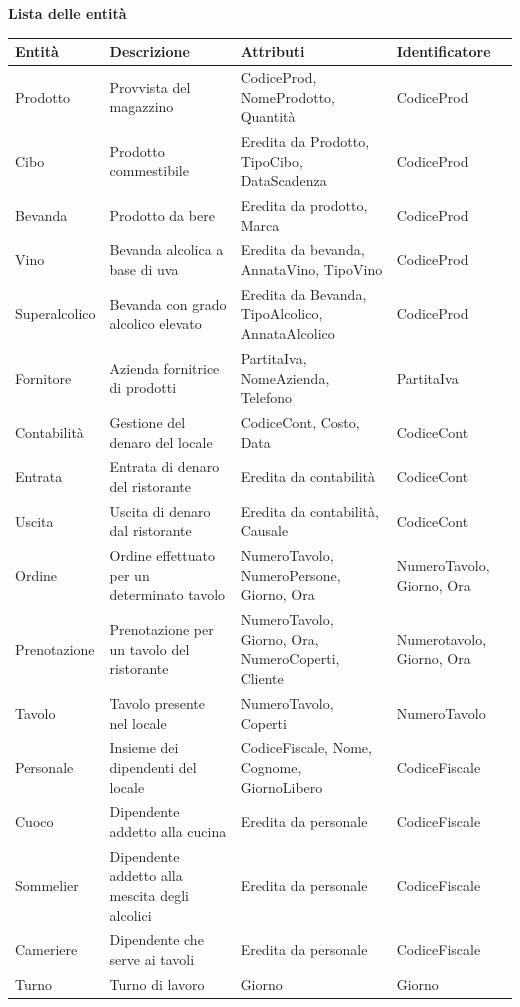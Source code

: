 \textbf{Lista delle entità}
\begin{longtable}{p{2.5cm} p{5.5cm} p{5.5cm} p{2.5cm}}
    \toprule
    \textbf{Entità} & \textbf{Descrizione} &   \textbf{Attributi} & \textbf{Identificatore}\\ \midrule
    Prodotto & Provvista del magazzino & CodiceProd, NomeProdotto, Quantità & CodiceProd\\ \midrule
    Cibo & Prodotto commestibile & Eredita da Prodotto, TipoCibo, DataScadenza & CodiceProd \\ \midrule
    Bevanda	& Prodotto da bere & Eredita da prodotto, Marca & CodiceProd\\ \midrule
    Vino & Bevanda alcolica a base di uva & Eredita da bevanda, AnnataVino, TipoVino & CodiceProd \\ \midrule
    Superalcolico & Bevanda con grado alcolico elevato & Eredita da Bevanda, TipoAlcolico, AnnataAlcolico & CodiceProd \\ \midrule
    Fornitore & Azienda fornitrice di prodotti & PartitaIva, NomeAzienda, Telefono & PartitaIva \\ \midrule
    Contabilità & Gestione del denaro del locale & CodiceCont, Costo, Data &CodiceCont \\ \midrule
    Entrata & Entrata di denaro del ristorante & Eredita da contabilità & CodiceCont \\ \midrule
    Uscita & Uscita di denaro dal ristorante & Eredita da contabilità, Causale & CodiceCont \\ \midrule
    Ordine & Ordine effettuato per un determinato tavolo & NumeroTavolo, NumeroPersone, Giorno, Ora & NumeroTavolo, Giorno, Ora\\ \midrule
    Prenotazione & Prenotazione per un tavolo del ristorante & NumeroTavolo, Giorno, Ora, NumeroCoperti, Cliente & Numerotavolo, Giorno, Ora \\ \midrule
    Tavolo & Tavolo presente nel locale & NumeroTavolo, Coperti & NumeroTavolo\\ \midrule
    Personale & Insieme dei dipendenti del locale & CodiceFiscale, Nome, Cognome, GiornoLibero & CodiceFiscale\\ \midrule
    Cuoco & Dipendente addetto alla cucina & Eredita da personale & CodiceFiscale\\ \midrule
    Sommelier & Dipendente addetto alla mescita degli alcolici & Eredita da personale & CodiceFiscale\\ \midrule
    Cameriere & Dipendente che serve ai tavoli & Eredita da personale & CodiceFiscale\\ \midrule
    Turno & Turno di lavoro & Giorno & Giorno\\ 
    \bottomrule	
\end{longtable}
